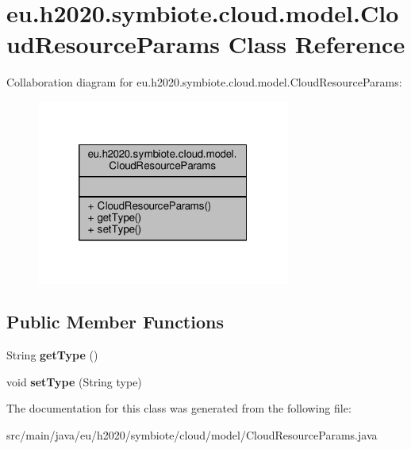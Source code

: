 \hypertarget{classeu_1_1h2020_1_1symbiote_1_1cloud_1_1model_1_1CloudResourceParams}{}\section{eu.\+h2020.\+symbiote.\+cloud.\+model.\+Cloud\+Resource\+Params Class Reference}
\label{classeu_1_1h2020_1_1symbiote_1_1cloud_1_1model_1_1CloudResourceParams}


Collaboration diagram for eu.\+h2020.\+symbiote.\+cloud.\+model.\+Cloud\+Resource\+Params\+:\nopagebreak
\begin{figure}[H]
\begin{center}
\leavevmode
\includegraphics[width=236pt]{classeu_1_1h2020_1_1symbiote_1_1cloud_1_1model_1_1CloudResourceParams__coll__graph}
\end{center}
\end{figure}
\subsection*{Public Member Functions}
\begin{DoxyCompactItemize}
\item 
\mbox{\label{classeu_1_1h2020_1_1symbiote_1_1cloud_1_1model_1_1CloudResourceParams_a455ded286bac953dc4eb9c11bbf58ab1}} 
String {\bfseries get\+Type} ()
\item 
\mbox{\label{classeu_1_1h2020_1_1symbiote_1_1cloud_1_1model_1_1CloudResourceParams_ab30a41a1687694a8b12c8cffa41eaec1}} 
void {\bfseries set\+Type} (String type)
\end{DoxyCompactItemize}


The documentation for this class was generated from the following file\+:\begin{DoxyCompactItemize}
\item 
src/main/java/eu/h2020/symbiote/cloud/model/Cloud\+Resource\+Params.\+java\end{DoxyCompactItemize}
